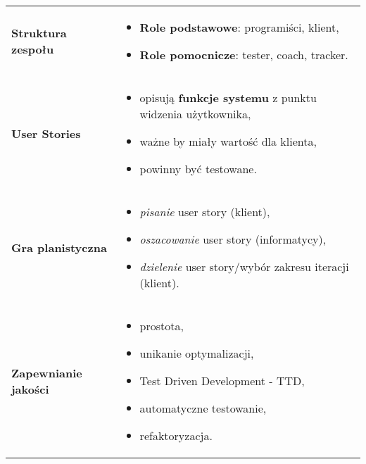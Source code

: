 \documentclass[../main.tex]{subfiles}
\begin{document}
    \begin{table}[H]
        \begin{center}
            \begin{tabular}{ p{8cm} p{8cm} }
                \textbf{Struktura zespołu}
                &
                \begin{itemize}
                    \item \textbf{Role podstawowe}: programiści, klient,
                    \item \textbf{Role pomocnicze}: tester, coach, tracker.
                \end{itemize}
                \\

                \cmidrule(r){1-1}\cmidrule(l){2-2}
                \textbf{User Stories}
                &
                \begin{itemize}
                    \item opisują \textbf{funkcje systemu} z punktu widzenia użytkownika,
                    \item ważne by miały wartość dla klienta,
                    \item powinny być testowane.
                \end{itemize}
                \\

                \cmidrule(r){1-1}\cmidrule(l){2-2}
                \textbf{Gra planistyczna}
                &
                \begin{itemize}
                    \item \textit{pisanie} user story (klient),
                    \item \textit{oszacowanie} user story (informatycy),
                    \item \textit{dzielenie} user story/wybór zakresu iteracji (klient).
                \end{itemize}
                \\

                \cmidrule(r){1-1}\cmidrule(l){2-2}
                \textbf{Zapewnianie jakości}
                &
                \begin{itemize}
                    \item prostota,
                    \item unikanie optymalizacji,
                    \item Test Driven Development - TTD,
                    \item automatyczne testowanie,
                    \item refaktoryzacja.
                \end{itemize}
                \\


\end{tabular}
\end{center}
\end{table}
\end{document}
